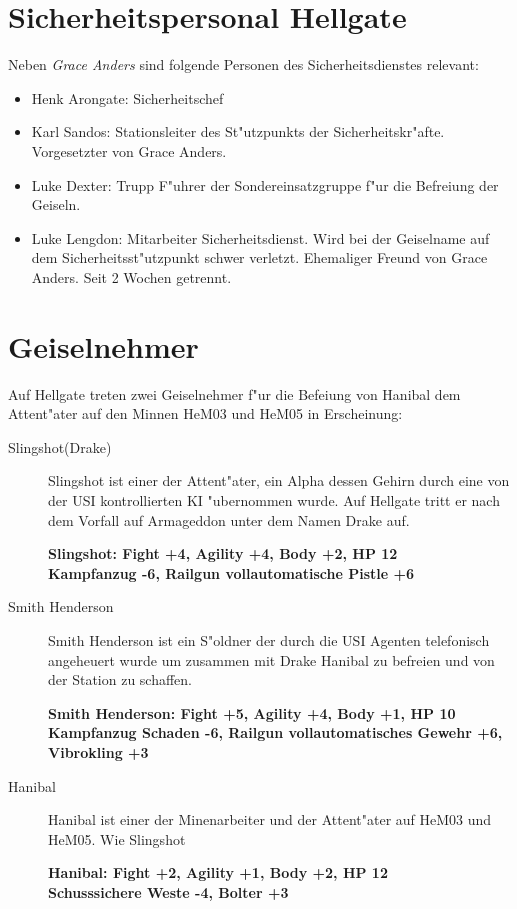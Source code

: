 \section{Sicherheitspersonal Hellgate}

Neben \emph{Grace Anders} sind folgende Personen des Sicherheitsdienstes relevant:

\begin{itemize}
    \item Henk Arongate: Sicherheitschef    
    \item Karl Sandos: Stationsleiter des St"utzpunkts der Sicherheitskr"afte. Vorgesetzter von Grace Anders.
    \item Luke Dexter: Trupp F"uhrer der Sondereinsatzgruppe f"ur die Befreiung der Geiseln.
    \item Luke Lengdon: Mitarbeiter Sicherheitsdienst. Wird bei der Geiselname auf dem Sicherheitsst"utzpunkt schwer 
    verletzt. Ehemaliger Freund von Grace Anders. Seit 2 Wochen getrennt.
\end{itemize}

\section{Geiselnehmer}

Auf Hellgate treten zwei Geiselnehmer f"ur die Befeiung von Hanibal dem Attent"ater auf den Minnen HeM03 und HeM05 in
Erscheinung:

\begin{description}
    \item[Slingshot(Drake)] Slingshot ist einer der Attent"ater, ein Alpha dessen Gehirn durch eine von der USI kontrollierten 
    KI "ubernommen wurde. Auf Hellgate tritt er nach dem Vorfall auf Armageddon unter dem Namen Drake auf.

    \textbf{Slingshot: Fight +4, Agility +4, Body +2, HP 12\\
    Kampfanzug -6, Railgun vollautomatische Pistle +6}

    \item[Smith Henderson] Smith Henderson ist ein S"oldner der durch die USI Agenten telefonisch angeheuert wurde um 
    zusammen mit Drake Hanibal zu befreien und von der Station zu schaffen.

    \textbf{Smith Henderson: Fight +5, Agility +4, Body +1, HP 10\\
    Kampfanzug Schaden -6, Railgun vollautomatisches Gewehr +6, Vibrokling +3}

    \item[Hanibal] Hanibal ist einer der Minenarbeiter und der Attent"ater auf HeM03 und HeM05. Wie Slingshot 

    \textbf{Hanibal: Fight +2, Agility +1, Body +2, HP 12\\
    Schusssichere Weste -4, Bolter +3}
\end{description}


